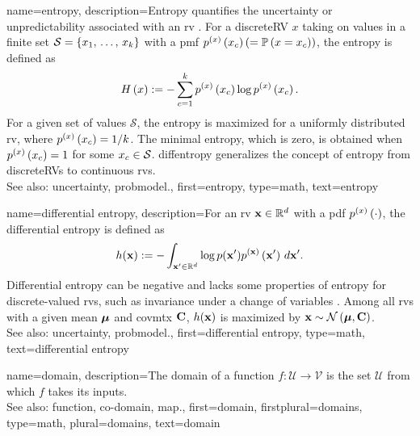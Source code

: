 {name={entropy},
	description={Entropy quantifies the \gls{uncertainty} or 
		unpredictability associated with an \gls{rv} \cite{coverthomas}. 
		For a \gls{discreteRV} $x$ taking on values in a finite set 
		$\mathcal{S} = \{x_1, \,\ldots, \,x_k\}$ with 
		a \gls{pmf} $p^{(x)}\left(x_{c}\right) (=\mathbb{P}\left(x = x_{c}\right))$, 
		the entropy is defined as \cite{coverthomas}
		\[
		   H\left(x\right) := -\sum_{c=1}^{k} p^{(x)}\left(x_{c}\right)  \log p^{(x)}\left(x_{c}\right).
		\]
		For a given set of values $\mathcal{S}$, the entropy is maximized for a 
		uniformly distributed \gls{rv}, where $p^{(x)}\left(x_{c}\right)=1/k$. 
		The minimal entropy, which is zero, is obtained when $p^{(x)}\left(x_{c}\right)=1$ 
		for some $x_{c} \in \mathcal{S}$.
		\Gls{diffentropy} generalizes the concept of entropy from \glspl{discreteRV} to 
		\gls{continuous} \glspl{rv}. 
		\\
		See also: \gls{uncertainty}, \gls{probmodel}.},
	first={entropy},
	type=math, 
	text={entropy}
}

{name={differential entropy},
	description={For an 
		\gls{rv} ${\bf x} \in \mathbb{R}^{d}$ 
		with a \gls{pdf} $p^{(x)}\left(\cdot\right)$, the differential \gls{entropy} 
		is defined as \cite{coverthomas}
		\[
			h({\bf x}) := - \int_{{\bf x}' \in \mathbb{R}^{d}} 
			\log p({\bf x}') p^{({\bf x})}\left({\bf x}'\right) \, d {\bf x}'.
		\]
		Differential \gls{entropy} can be negative and lacks some properties of 
		\gls{entropy} for discrete-valued \glspl{rv}, such as invariance under 
		a change of variables \cite{coverthomas}. Among all \glspl{rv} with a 
		given \gls{mean} ${\bm \mu}$ and \gls{covmtx} ${\bf C}$, 
		$h({\bf x})$ is maximized by ${\bf x} \sim \mathcal{N}\left({\bm \mu},{\bf C}\right)$. 
		\\
		See also: \gls{uncertainty}, \gls{probmodel}.},
	first={differential entropy},
	type=math,
	text={differential entropy}
}

{name={domain}, 
	description={The domain of a \gls{function} 
		$f: \mathcal{U} \rightarrow \mathcal{V}$ is the set $\mathcal{U}$ 
		from which $f$ takes its inputs.  
		\\
		See also: \gls{function}, \gls{co-domain}, \gls{map}.},
	first={domain},
	firstplural={domains}, 
	type=math, 
	plural={domains},
	text={domain}
}

